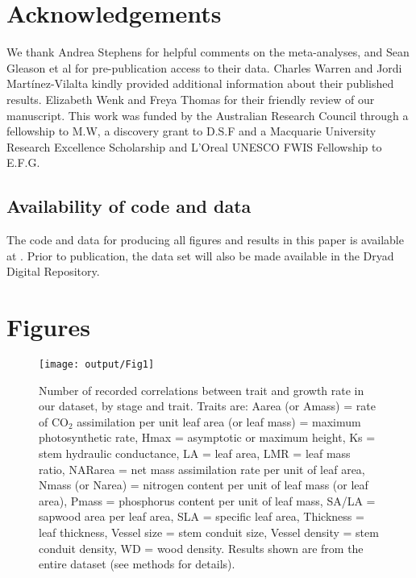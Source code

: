 \documentclass[a4paper,11pt]{article}
\begin{document}
\section*{Acknowledgements}\label{Acknowledgment}

We thank Andrea Stephens for helpful comments on the meta-analyses, and Sean Gleason et al for pre-publication access to their data. Charles Warren and Jordi Mart{\'{i}}nez-Vilalta kindly provided additional information about their published results. Elizabeth Wenk and Freya Thomas for their friendly review of our manuscript. This work was funded by the Australian Research Council through a fellowship to M.W, a discovery grant to D.S.F and a Macquarie University Research Excellence Scholarship and L'Oreal UNESCO FWIS Fellowship to E.F.G.

\subsection*{Availability of code and data}\label{code}

The code and data for producing all figures and results in this paper is available at . Prior to publication, the data set will also be made available in the Dryad Digital Repository.

\linespread{1}
\label{references}

\clearpage
\section*{Figures}

\begin{figure}[h!]
\centering
\texttt{[image: output/Fig1]}
\caption{Number of recorded correlations between trait and growth rate in our dataset, by stage and trait. Traits are: Aarea (or Amass) = rate of CO$_{2}$ assimilation per unit leaf area (or leaf mass) = maximum photosynthetic rate, Hmax = asymptotic or maximum height, Ks = stem hydraulic conductance, LA = leaf area, LMR = leaf mass ratio, NARarea = net mass assimilation rate per unit of leaf area, Nmass (or Narea) = nitrogen content per unit of leaf mass (or leaf area), Pmass = phosphorus content per unit of leaf mass, SA/LA = sapwood area per leaf area, SLA = specific leaf area, Thickness = leaf thickness, Vessel size = stem conduit size, Vessel density = stem conduit density, WD = wood density. Results shown are from the entire dataset (see methods for details).}
\label{fig:fig1}
\end{figure}
\end{document}
